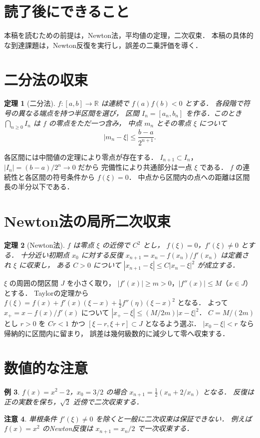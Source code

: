 \documentclass[a5paper,10pt,onecolumn]{jsarticle}
\makeatletter
\theoremstyle{mathnotetheorem}
\newtheorem{theorem}{定理}[section]
\newtheorem{example}[theorem]{例}
\newtheorem{remark}[theorem]{注意}
\renewcommand{\proofname}{証明}
\renewenvironment{proof}[1][\proofname]{%
  \par\pushQED{\qed}\normalfont\topsep4\p@\@plus2\p@\relax
  \trivlist\item[\hskip\labelsep\bfseries #1]\ignorespaces
}{\popQED\endtrivlist\@endpefalse}
\makeatother
\begin{document}
\section*{読了後にできること}
本稿を読むための前提は，Newton法，平均値の定理，二次収束．
本稿の具体的な到達課題は，Newton反復を実行し，誤差の二乗評価を導く．

\section{二分法の収束}
\begin{theorem}[二分法]
$f:[a,b]\to\mathbb R$ は連続で $f(a)f(b)<0$ とする．
各段階で符号の異なる端点を持つ半区間を選び，
区間 $I_n=[a_n,b_n]$ を作る．このとき
$\bigcap_{n\ge0}I_n$ は $f$ の零点をただ一つ含み，
中点 $m_n$ とその零点 $\xi$ について
\[
 |m_n-\xi|\le\frac{b-a}{2^{n+1}}.
\]
\end{theorem}
\begin{proof}
各区間には中間値の定理により零点が存在する．
$I_{n+1}\subset I_n$，$|I_n|=(b-a)/2^n\to0$ だから
完備性により共通部分は一点 $\xi$ である．
$f$ の連続性と各区間の符号条件から $f(\xi)=0$．
中点から区間内の点への距離は区間長の半分以下である．
\end{proof}
\section{Newton法の局所二次収束}
\begin{theorem}[Newton法]
$f$ は零点 $\xi$ の近傍で $C^2$ とし，
$f(\xi)=0$，$f'(\xi)\ne0$ とする．
十分近い初期点 $x_0$ に対する反復
$ x_{n+1}=x_n-f(x_n)/f'(x_n)$ は定義され $\xi$ に収束し，
ある $C>0$ について
$|x_{n+1}-\xi|\le C|x_n-\xi|^2$ が成立する．
\end{theorem}
\begin{proof}
$\xi$ の周囲の閉区間 $J$ を小さく取り，
$|f'(x)|\ge m>0$，$|f''(x)|\le M$（$x\in J$）とする．
Taylorの定理から $f(\xi)=f(x)+f'(x)(\xi-x)
+\frac12 f''(\eta)(\xi-x)^2$ となる．
よって $x_+=x-f(x)/f'(x)$ について
$|x_+-\xi|\le (M/2m)|x-\xi|^2$．
$C=M/(2m)$ とし $r>0$ を $Cr<1$ かつ
$[\xi-r,\xi+r]\subset J$ となるよう選ぶ．
$|x_0-\xi|<r$ なら帰納的に区間内に留まり，
誤差は幾何級数的に減少して零へ収束する．
\end{proof}
\section{数値的な注意}
\begin{example}
$f(x)=x^2-2$，$x_0=3/2$ の場合
$ x_{n+1}=\frac12(x_n+2/x_n)$ となる．
反復は正の実数を保ち，$\sqrt2$ 近傍で二次収束する．
\end{example}
\begin{remark}
単根条件 $f'(\xi)\ne0$ を除くと一般に二次収束は保証できない．
例えば $f(x)=x^2$ のNewton反復は $x_{n+1}=x_n/2$ で一次収束する．
\end{remark}
\end{document}
